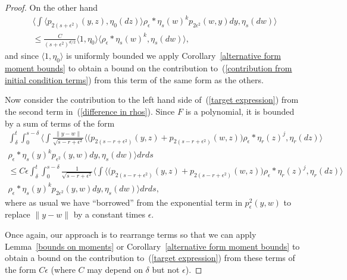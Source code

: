 \documentclass[EJP]{ejpecp} %
\begin{document}
\begin{proof}
On the other hand
\begin{multline*}
\big\langle \int \langle p_{2(s+\epsilon^2)}(y,z), \eta_0(dz)\rangle
\rho_\epsilon*\eta_s(w)^kp_{2\epsilon^2}(w,y)dy, \eta_s(dw)\big\rangle
\\
\leq \frac{C}{(s+\epsilon^2)^{d/2}}\langle 1,\eta_0\rangle\big\langle
\rho_\epsilon*\eta_s(w)^k,\eta_s(dw)\big\rangle,
\end{multline*}
and since $\langle 1,\eta_0\rangle$ is uniformly bounded we apply 
Corollary~\ref{alternative form moment bounds} to obtain a bound on
the contribution to~(\ref{contribution from initial condition terms})
from this term of the same form as the others.

Now consider the contribution to the left hand side of~(\ref{target expression})
from the second term in~(\ref{difference in rhos}). Since $F$ is a polynomial,
it is bounded by a sum of terms of the form
\begin{multline*}
\int_\delta^t\int_0^{s-\delta}\Big\langle\int\frac{\|y-w\|}{\sqrt{s-r+\epsilon^2}}
\big\langle\big(p_{2(s-r+\epsilon^2)}(y,z)+ p_{2(s-r+\epsilon^2)}(w,z)\big)
\rho_\epsilon*\eta_r(z)^j,\eta_r(dz)\big\rangle
\\
\rho_\epsilon*\eta_s(y)^kp_{\epsilon^2}(y,w)dy,\eta_s(dw)
\Big\rangle dr ds
\\
\leq C\epsilon
\int_\delta^t\int_0^{s-\delta}
	\frac{1}{\sqrt{s-r+\epsilon^2}}
	\Big\langle\int
\big\langle
\big(p_{2(s-r+\epsilon^2)}(y,z)+ p_{2(s-r+\epsilon^2)}(w,z)\big)
\rho_\epsilon*\eta_r(z)^j,\eta_r(dz)\big\rangle 
\\
\rho_\epsilon*\eta_s(y)^kp_{2\epsilon^2}(y,w)dy,\eta_s(dw)
\Big\rangle dr ds,
\end{multline*}
where as usual we have ``borrowed'' from the exponential term in
$p_\epsilon^2(y,w)$ to replace $\|y-w\|$ by a constant times $\epsilon$.

Once again, our approach is to rearrange terms so that we can apply
Lemma~\ref{bounds on moments}
or 
Corollary~\ref{alternative form moment bounds} to obtain a bound on
the contribution to~(\ref{target expression})
from these terms of the form $C\epsilon$ (where $C$ may depend on $\delta$
but not $\epsilon$).


\end{proof}
\end{document}
